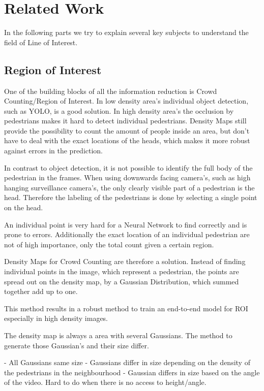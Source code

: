 \section{Related Work}
In the following parts we try to explain several key subjects to understand the field of Line of Interest.

\subsection{Region of Interest}
One of the building blocks of all the information reduction is Crowd Counting/Region of Interest. In low density area's individual object detection, such as YOLO, is a good solution. In high density area's the occlusion by pedestrians makes it hard to detect individual pedestrians. Density Maps still provide the possibility to count the amount of people inside an area, but don't have to deal with the exact locations of the heads, which makes it more robust against errors in the prediction.

In contrast to object detection, it is not possible to identify the full body of the pedestrian in the frames. When using downwards facing camera's, such as high hanging surveillance camera's, the only clearly visible part of a pedestrian is the head. Therefore the labeling of the pedestrians is done by selecting a single point on the head.

An individual point is very hard for a Neural Network to find correctly and is prone to errors. Additionally the exact location of an individual pedestrian are not of high importance, only the total count given a certain region.

Density Maps for Crowd Counting are therefore a solution. Instead of finding individual points in the image, which represent a pedestrian, the points are spread out on the density map, by a Gaussian Distribution, which summed together add up to one.

This method results in a robust method to train an end-to-end model for ROI especially in high density images.


The density map is always a area with several Gaussians. The method to generate those Gaussian's and their size differ.

- All Gaussians same size
- Gaussians differ in size depending on the density of the pedestrians in the neighbourhood
- Gaussian differs in size based on the angle of the video. Hard to do when there is no access to height/angle.

